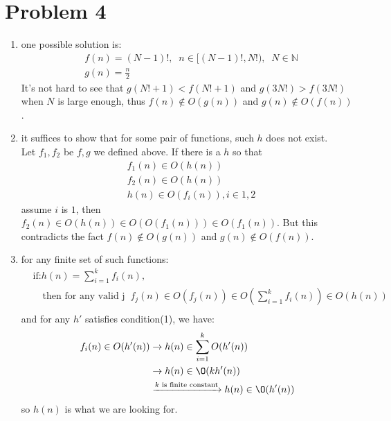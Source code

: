 \documentclass[paper=a4, fontsize=11pt]{scrartcl} %
\numberwithin{equation}{section} %
\numberwithin{figure}{section} %
\numberwithin{table}{section} %
\begin{document}
\section*{Problem 4}
\begin{enumerate}[label={4.\arabic*}]
  \item one possible solution is:
    \begin{align*}
      & f(n) = (N-1)!, \;\;n \in [(N-1)!, N!),\;\;N \in \mathbb{N}\\
      & g(n) = \frac{n}{2}
    \end{align*}
    It's not hard to see that $g(N! + 1) < f(N! + 1)$ and $g(3N!) > f(3N!)$ when $N$ is large enough, thus
    $f(n) \notin O(g(n))$ and $g(n) \notin O(f(n))$.

  \item it suffices to show that for some pair of functions, such $h$ does not exist.\\
    Let $f_1,f_2$ be $f,g$ we defined above. If there is a $h$ so that 
    \begin{align*}
      & f_1(n) \in O(h(n)) \\
      & f_2(n) \in O(h(n)) \\
      & h(n) \in O(f_i(n)), i \in {1,2}
    \end{align*}
    assume $i$ is $1$, then $f_2(n) \in O(h(n)) \in O(O(f_1(n))) \in O(f_1(n))$. But this
    contradicts the fact $f(n) \notin O(g(n))$ and $g(n) \notin O(f(n))$.

  \item for any finite set of such functions:
    \begin{align*}
      &\text{if:} h(n)= \sum^{k}_{i=1}f_i(n), \\
      &\quad \text{then for any valid j}\;\; f_j(n) \in O(f_j(n)) \in O(\sum^{k}_{i=1}f_i(n)) \in O(h(n)) \\
    \end{align*}
    and for any $h'$ satisfies condition(1), we have:
    \begin{align*}
      f_i(n) \in O(h'(n)) & \rightarrow h(n) \in \sum^{k}_{i=1}O(h'(n)) \\
			  & \rightarrow h(n) \in \O(kh'(n))\\
     			  & \xrightarrow{\text{$k$ is finite constant}} h(n) \in \O(h'(n))\\
    \end{align*}
    so $h(n)$ is what we are looking for.
\end{enumerate}
\end{document}
